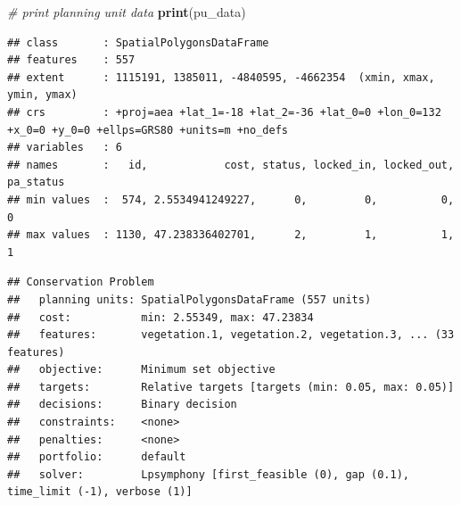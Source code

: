 \documentclass[12pt,]{book}
\newenvironment{Shaded}{\begin{snugshade}}{\end{snugshade}}
\newcommand{\KeywordTok}[1]{\textcolor[rgb]{0.13,0.29,0.53}{\textbf{#1}}}
\newcommand{\DataTypeTok}[1]{\textcolor[rgb]{0.13,0.29,0.53}{#1}}
\newcommand{\FloatTok}[1]{\textcolor[rgb]{0.00,0.00,0.81}{#1}}
\newcommand{\StringTok}[1]{\textcolor[rgb]{0.31,0.60,0.02}{#1}}
\newcommand{\CommentTok}[1]{\textcolor[rgb]{0.56,0.35,0.01}{\textit{#1}}}
\newcommand{\OperatorTok}[1]{\textcolor[rgb]{0.81,0.36,0.00}{\textbf{#1}}}
\newcommand{\NormalTok}[1]{#1}
\begin{document}
\begin{Shaded}
\begin{Highlighting}[]
\CommentTok{# print planning unit data}
\KeywordTok{print}\NormalTok{(pu_data)}
\end{Highlighting}
\end{Shaded}

\begin{verbatim}
## class       : SpatialPolygonsDataFrame 
## features    : 557 
## extent      : 1115191, 1385011, -4840595, -4662354  (xmin, xmax, ymin, ymax)
## crs         : +proj=aea +lat_1=-18 +lat_2=-36 +lat_0=0 +lon_0=132 +x_0=0 +y_0=0 +ellps=GRS80 +units=m +no_defs 
## variables   : 6
## names       :   id,            cost, status, locked_in, locked_out, pa_status 
## min values  :  574, 2.5534941249227,      0,         0,          0,         0 
## max values  : 1130, 47.238336402701,      2,         1,          1,         1
\end{verbatim}

\begin{Shaded}
\end{Shaded}

\begin{verbatim}
## Conservation Problem
##   planning units: SpatialPolygonsDataFrame (557 units)
##   cost:           min: 2.55349, max: 47.23834
##   features:       vegetation.1, vegetation.2, vegetation.3, ... (33 features)
##   objective:      Minimum set objective 
##   targets:        Relative targets [targets (min: 0.05, max: 0.05)]
##   decisions:      Binary decision 
##   constraints:    <none>
##   penalties:      <none>
##   portfolio:      default
##   solver:         Lpsymphony [first_feasible (0), gap (0.1), time_limit (-1), verbose (1)]
\end{verbatim}
\end{document}
